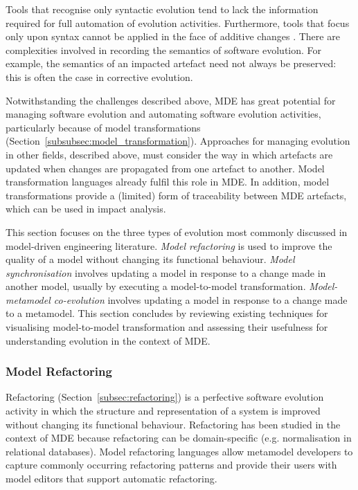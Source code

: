 Tools that recognise only syntactic evolution tend to lack the information required for full automation of evolution activities. Furthermore, tools that focus only upon syntax cannot be applied in the face of additive changes \cite{gruschko07towards}. There are complexities involved in recording the semantics of software evolution. For example, the semantics of an impacted artefact need not always be preserved: this is often the case in corrective evolution.

Notwithstanding the challenges described above, MDE has great potential for managing software evolution and automating software evolution activities, particularly because of model transformations (Section~\ref{subsubsec:model_transformation}). Approaches for managing evolution in other fields, described above, must consider the way in which artefacts are updated when changes are propagated from one artefact to another. Model transformation languages already fulfil this role in MDE. In addition, model transformations provide a (limited) form of traceability between MDE artefacts, which can be used in impact analysis.

This section focuses on the three types of evolution most commonly discussed in model-driven engineering literature. \emph{Model refactoring} is used to improve the quality of a model without changing its functional behaviour. \emph{Model synchronisation} involves updating a model in response to a change made in another model, usually by executing a model-to-model transformation. \emph{Model-metamodel co-evolution} involves updating a model in response to a change made to a metamodel. This section concludes by reviewing existing techniques for visualising model-to-model transformation and assessing their usefulness for understanding evolution in the context of MDE. 

\subsubsection{Model Refactoring}
Refactoring (Section~\ref{subsec:refactoring}) is a perfective software evolution activity in which the structure and representation of a system is improved without changing its functional behaviour.  Refactoring has been studied in the context of MDE because refactoring can be domain-specific (e.g. normalisation in relational databases). Model refactoring languages allow metamodel developers to capture commonly occurring refactoring patterns and provide their users with model editors that support automatic refactoring. 

